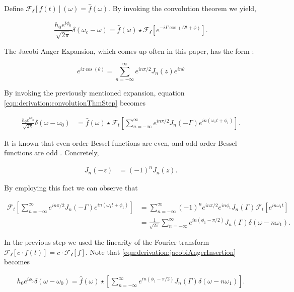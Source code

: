 \documentclass[onecolumn, groupedaddress, 10pt]{revtex4-1}
\begin{document}
Define $\mathcal{F_t}[f(t)](\omega) = \hat{f}(\omega)$. By invoking the convolution theorem we yield,

\begin{equation}
\label{eqn:derivation:convolutionThmStep}
\frac{h_0 e^{i\phi_0}}{\sqrt{2\pi}} \delta (\omega_c - \omega) = \hat{f}(\omega) \star \mathcal{F_t} \left[ e^{-i\Gamma \cos (\Omega t + \phi)} \right].
\end{equation}

The Jacobi-Anger Expansion, which comes up often in this paper, has the form \cite{}:

\begin{equation}
\label{eqn:jacobiAnger}
e^{iz\cos (\theta)} = \sum_{n=-\infty}^{\infty} e^{in\pi/2} J_n(z) e^{in\theta}
\end{equation}

By invoking the previously mentioned expansion, equation \ref{eqn:derivation:convolutionThmStep} becomes

\begin{align}
\label{eqn:derivation:jacobiAngerInsertion}
\frac{h_0 e^{i\phi_0}}{\sqrt{2\pi}} \delta (\omega - \omega_0)
&=
\hat{f}(\omega)
\star \mathcal{F}_t \left[ \sum_{n=-\infty}^{\infty} e^{in\pi/2} J_n(-\Gamma) e^{in(\omega_1 t + \phi_1)} \right].
\end{align}

It is known that even order Bessel functions are even, and odd order Bessel functions are odd \cite{}.  Concretely,

\begin{align}
	J_n(-z) &= (-1)^n J_n(z).
\end{align}

By employing this fact we can observe that

\begin{align}
\mathcal{F}_t \left[ \sum_{n=-\infty}^{\infty} e^{in\pi/2} J_n(-\Gamma) e^{in(\omega_1 t + \phi_1)} \right]
&= \sum_{n=-\infty}^{\infty} (-1)^n e^{in\pi/2} e^{in\phi_1} J_n(\Gamma) \mathcal{F}_t \left[e^{in\omega_1 t} \right]	 \\
&= \frac{1}{\sqrt{2\pi}}\sum_{n=-\infty}^{\infty} e^{in(\phi_1 - \pi/2)} J_n(\Gamma) \delta (\omega - n\omega_1).
\end{align}

In the previous step we used the linearity of the Fourier transform $\mathcal{F_t}[c \cdot f(t)] = c \cdot \mathcal{F_t}[f]$.  Note that \ref{eqn:derivation:jacobiAngerInsertion} becomes

\begin{align}
h_0 e^{i\phi_0} \delta (\omega - \omega_0) = \hat{f}(\omega)
\star
\left[ \sum_{n=-\infty}^{\infty} e^{in(\phi_1 - \pi/2)} J_n(\Gamma) \delta (\omega - n\omega_1) \right].
\end{align}
\end{document}
